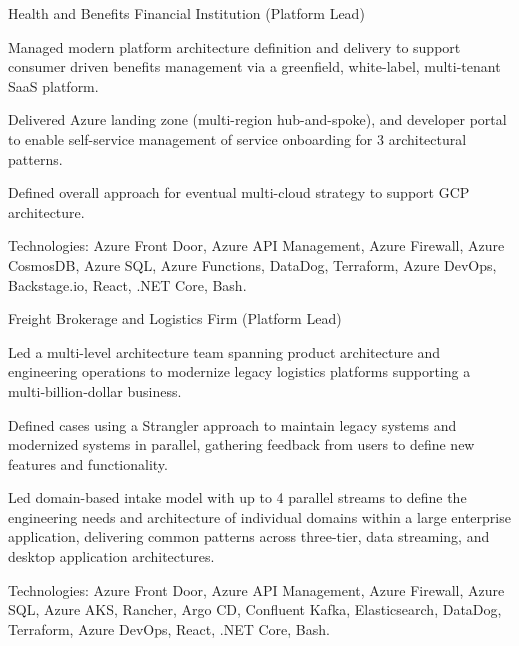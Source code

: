 \begin{cventries}
  \cventry
    {Health and Benefits Financial Institution (Platform Lead)} %
    {} %
    {} %
    {} %
    {
      \begin{cvitems} %
        \item {Managed modern platform architecture definition and delivery to support consumer driven benefits management via a greenfield, white-label, multi-tenant SaaS platform.}
        \item {Delivered Azure landing zone (multi-region hub-and-spoke), and developer portal to enable self-service management of service onboarding for 3 architectural patterns.}
        \item {Defined overall approach for eventual multi-cloud strategy to support GCP architecture.}
        \item {Technologies: Azure Front Door, Azure API Management, Azure Firewall, Azure CosmosDB, Azure SQL, Azure Functions, DataDog, Terraform, Azure DevOps, Backstage.io, React, .NET Core, Bash.}
      \end{cvitems}
    }

  \cventry
    {Freight Brokerage and Logistics Firm (Platform Lead)} %
    {} %
    {} %
    {} %
    {
      \begin{cvitems} %
        \item {Led a multi-level architecture team spanning product architecture and engineering operations to modernize legacy logistics platforms supporting a multi‑billion‑dollar business.}
        \item {Defined cases using a Strangler approach to maintain legacy systems and modernized systems in parallel, gathering feedback from users to define new features and functionality.}
        \item {Led domain-based intake model with up to 4 parallel streams to define the engineering needs and architecture of individual domains within a large enterprise application, delivering common patterns across three-tier, data streaming, and desktop application architectures.}
        \item {Technologies: Azure Front Door, Azure API Management, Azure Firewall, Azure SQL, Azure AKS, Rancher, Argo CD, Confluent Kafka, Elasticsearch, DataDog, Terraform, Azure DevOps, React, .NET Core, Bash.}
      \end{cvitems}
    }


\end{cventries}
